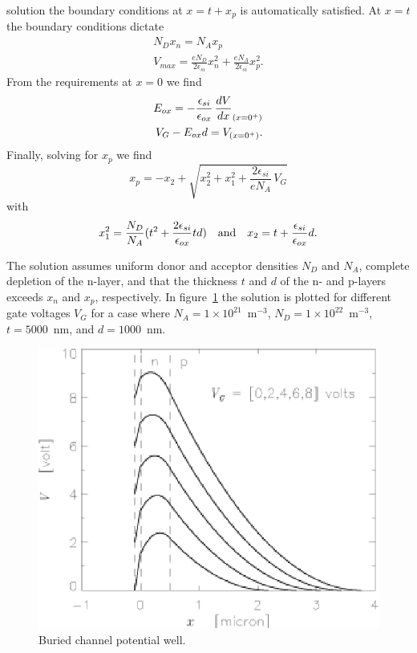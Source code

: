 solution the boundary conditions at $x = t+x_p$ is automatically satisfied.
At $x = t$ the boundary conditions dictate
\begin{eqnarray}
  N_D x_n = N_A x_p 
	\label{CCD.xn} \\
  V_{max} = \frac{eN_D}{2\epsilon_{si}}x_n^2 +
	\frac{eN_A}{2\epsilon_{si}}x_p^2.
	\label{CCD.Vmax}
\end{eqnarray}
From the requirements at $x = 0$ we find
\begin{eqnarray}
  E_{ox} = - \frac{\epsilon_{si}}{\epsilon_{ox}} \, {d{V}\over{dx}}_{(x=0^+)} \\
  V_G - E_{ox}d = V_{(x=0^+)}.
  \label{CCD.VG}
\end{eqnarray}
Finally, solving for $x_p$ we find
\begin{equation}
  x_p = -x_2+\sqrt{x_2^2+x_1^2+\frac{2\epsilon_{si}}{eN_A} \, V_G}
  \label{CCD.xp}
\end{equation}
with
\begin{equation}
  x_1^2 = \frac{N_D}{N_A}(t^2+\frac{2\epsilon_{si}}{\epsilon_{ox}}td)
  \quad {\rm and} \quad
  x_2 = t+\frac{\epsilon_{si}}{\epsilon_{ox}}d.
  \label{CCD.x12}
\end{equation}

The solution assumes uniform donor and acceptor densities $N_D$ and
$N_A$, complete depletion of the n-layer, and that the thickness $t$
and $d$ of the n- and p-layers exceeds $x_n$ and $x_p$, respectively.
In figure~\ref{CCD.figburchan} the solution is plotted for different
gate voltages $V_G$ for a case where 
$N_A = 1\times 10^{21}$~m$^{-3}$, $N_D = 1\times 10^{22}$~m$^{-3}$, 
$t = 5000$~nm, and $d = 1000$~nm.

\begin{figure}[h]
  \centering
	\includegraphics{CCD_burchan.eps}
  \caption{Buried channel potential well.}
  \label{CCD.figburchan}
\end{figure}


